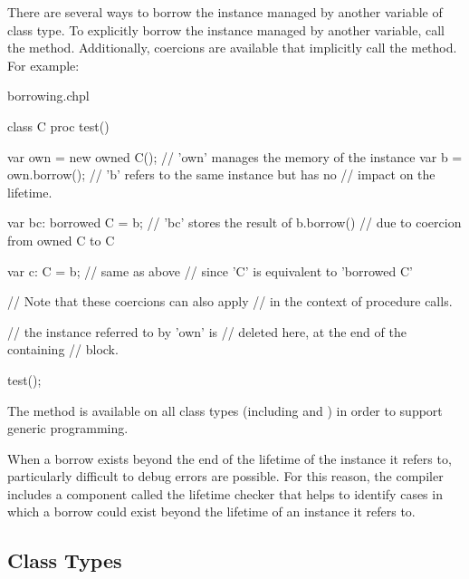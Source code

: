 There are several ways to borrow the instance managed by another variable
of class type. To explicitly borrow the instance managed by another
variable, call the  method. Additionally, coercions
are available that implicitly call the  method. For example:

\begin{chapelexample}{borrowing.chpl}
\begin{chapel}
class C { }
proc test() {
  var own = new owned C(); // 'own' manages the memory of the instance
  var b = own.borrow();    // 'b' refers to the same instance but has no
                           // impact on the lifetime.

  var bc: borrowed C = b;  // 'bc' stores the result of b.borrow()
                           // due to coercion from owned C to C

  var c: C = b;            // same as above
                           // since 'C' is equivalent to 'borrowed C'

                           // Note that these coercions can also apply
                           // in the context of procedure calls.

                           // the instance referred to by 'own' is
                           // deleted here, at the end of the containing
                           // block.
}
\end{chapel}
\begin{chapelpost}
test();
\end{chapelpost}
\begin{chapeloutput}
\end{chapeloutput}
\end{chapelexample}

The  method is available on all class types (including
 and ) in order to support generic
programming.

When a borrow exists beyond the end of the lifetime of the instance it
refers to, particularly difficult to debug errors are possible. For this
reason, the compiler includes a component called the lifetime checker that
helps to identify cases in which a borrow could exist beyond the lifetime
of an instance it refers to.

\subsection{Class Types}
\label{Class_Types}

